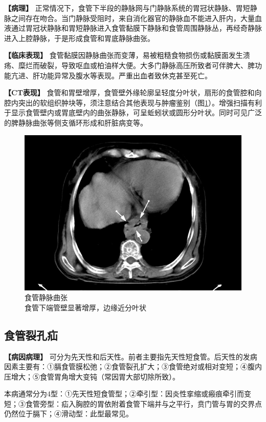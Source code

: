 \textbf{【病理】}
正常情况下，食管下半段的静脉网与门静脉系统的胃冠状静脉、胃短静脉之间存在吻合。当门静脉受阻时，来自消化器官的静脉血不能进入肝内，大量血液通过胃冠状静脉和胃短静脉进入食管黏膜下静脉和食管周围静脉丛，再经奇静脉进入上腔静脉，于是形成食管和胃底静脉曲张。

\textbf{【临床表现】}
食管黏膜因静脉曲张而变薄，易被粗糙食物损伤或黏膜面发生溃疡、糜烂而破裂，导致呕血或柏油样大便。大多门静脉高压所致者可伴脾大、脾功能亢进、肝功能异常及腹水等表现。严重出血者致休克甚至死亡。

\textbf{【CT表现】}
食管和胃壁增厚，食管壁外缘轮廓呈轻度分叶状，扇形的食管腔和向腔内突出的软组织肿块等，须注意结合其他表现与肿瘤鉴别（图\ref{fig17-2}）。增强扫描有利于显示食管壁内或胃底壁内的曲张静脉，可呈蚯蚓状或圆形分叶状。同时可见广泛的脾静脉曲张等侧支循环形成和肝脏病变等。

\begin{figure}[!htbp]
 \centering
 \includegraphics[width=.7\textwidth,height=\textheight,keepaspectratio]{./images/Image00353.jpg}
 \captionsetup{justification=centering}
 \caption{食管静脉曲张\\{\small 食管下端管壁显著增厚，边缘近分叶状}}
 \label{fig17-2}
  \end{figure} 

\subsection{食管裂孔疝}

\textbf{【病因病理】}
可分为先天性和后天性。前者主要指先天性短食管。后天性的发病因素主要有：①膈食管膜松弛；②食管裂孔扩大；③食管绝对或相对变短；④腹内压增大；⑤食管胃角增大变钝（常因胃大部切除所致）。

本病通常分为4型：①先天性短食管型；②牵引型：因炎性挛缩或瘢痕牵引而变短；③食管旁型：疝入胸腔的胃依附着食管下端并与之平行，贲门管与胃的交界点仍然位于膈下；④滑动型：此型最常见。

